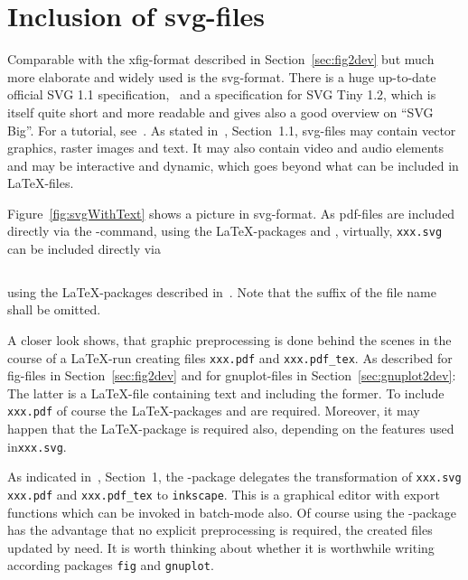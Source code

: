 \section{Inclusion of svg-files}\label{sec:picSvg}

Comparable with the xfig-format described in Section~\ref{sec:fig2dev} 
but much more elaborate and widely used is the \gls{svg}-format. 
There is a huge up-to-date official SVG 1.1 specification,~\cite{Svg11} 
and a specification for SVG Tiny 1.2, 
\cite{Svg12Tiny} which is itself quite short and more readable 
and gives also a good overview on ``SVG Big''. 
For a tutorial, see~\cite{SvgTut}. 
As stated in~\cite{Svg12Tiny}, Section~1.1, 
svg-files may contain vector graphics, raster images and text. 
It may also contain video and audio elements 
and may be interactive and dynamic, 
which goes beyond what can be included in \LaTeX-files. 

Figure~\ref{fig:svgWithText} shows a picture in \gls{svg}-format. 
As pdf-files are included directly 
via the -command, 
using the \LaTeX-packages  and , 
virtually, 
\texttt{xxx.svg} can be included directly via 
\begin{lstlisting}[language=TeX]
%%
\end{lstlisting}
%
using the \LaTeX-packages  described in~\cite{SvgP}. 
Note that the suffix of the file name shall be omitted. 

A closer look shows, that graphic preprocessing is done behind the scenes 
in the course of a \LaTeX-run 
creating files \texttt{xxx.pdf} and \texttt{xxx.pdf\_tex}. 
As described for fig-files in Section~\ref{sec:fig2dev} 
and for gnuplot-files in Section~\ref{sec:gnuplot2dev}: 
The latter is a \LaTeX-file containing text 
and including the former. 
To include \texttt{xxx.pdf} 
of course the \LaTeX-packages  and  
are required. 
Moreover, it may happen that the \LaTeX-package  
is required also, depending on the features used in\texttt{xxx.svg}. 

As indicated in~\cite{SvgP}, Section~1, 
the -package delegates the transformation 
of \texttt{xxx.svg} \texttt{xxx.pdf} and \texttt{xxx.pdf\_tex} 
to \texttt{inkscape}. 
This is a graphical editor with export functions 
which can be invoked in batch-mode also. 
Of course using the -package has the advantage 
that no explicit preprocessing is required, 
the created files updated by need. 
It is worth thinking about whether it is worthwhile 
writing according packages \texttt{fig} and \texttt{gnuplot}. 

